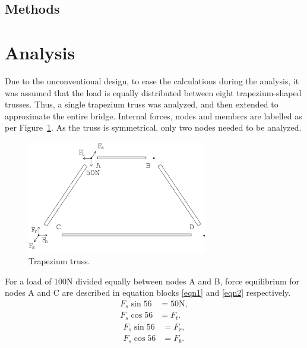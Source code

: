\documentclass[12pt]{article}
\begin{document}
		\subsection{Methods}
	\section{Analysis}
		Due to the unconventional design, to ease the calculations during the analysis, it was assumed that the load is equally distributed between eight trapezium-shaped trusses. Thus, a single trapezium truss was analyzed, and then extended to approximate the entire bridge. Internal forces, nodes and members are labelled as per Figure~\ref{trap}. As the truss is symmetrical, only two nodes needed to be analyzed.
		\begin{figure}[h!]
			\centering
			\includegraphics[width=0.7\textwidth]{trapanal}
			\caption{Trapezium truss.}
			\label{trap}
		\end{figure}
		For a load of 100N divided equally between nodes A and B, force equilibrium for nodes A and C are described in equation blocks \ref{eqn1} and \ref{eqn2} respectively.
		\begin{subequations}
			\begin{align}
				F_s \sin 56&=50\mathrm{N}, \\
				F_s \cos 56&=F_t.
			\end{align} \label{eqn1}
		\end{subequations}
		\begin{subequations}
			\begin{align}
				F_s \sin 56&=F_r, \\ 
				F_s \cos 56&=F_b.
			\end{align} \label{eqn2}
		\end{subequations}
\end{document}
